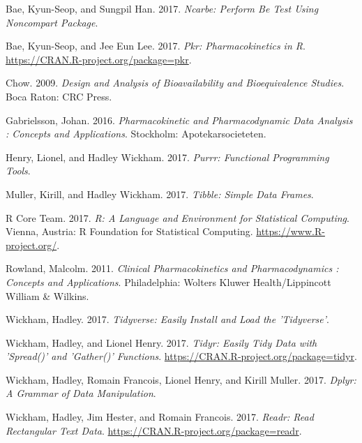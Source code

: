 \documentclass[12pt,]{krantz}
\theoremstyle{definition}
\theoremstyle{definition}
\theoremstyle{definition}
\theoremstyle{remark}
\begin{document}
\hypertarget{ref-R-ncarbe}{}
Bae, Kyun-Seop, and Sungpil Han. 2017. \emph{Ncarbe: Perform Be Test
Using Noncompart Package}.

\hypertarget{ref-R-pkr}{}
Bae, Kyun-Seop, and Jee Eun Lee. 2017. \emph{Pkr: Pharmacokinetics in
R}. \url{https://CRAN.R-project.org/package=pkr}.

\hypertarget{ref-chow2009design}{}
Chow. 2009. \emph{Design and Analysis of Bioavailability and
Bioequivalence Studies}. Boca Raton: CRC Press.

\hypertarget{ref-gab}{}
Gabrielsson, Johan. 2016. \emph{Pharmacokinetic and Pharmacodynamic Data
Analysis : Concepts and Applications}. Stockholm: Apotekarsocieteten.

\hypertarget{ref-R-purrr}{}
Henry, Lionel, and Hadley Wickham. 2017. \emph{Purrr: Functional
Programming Tools}.

\hypertarget{ref-R-tibble}{}
Muller, Kirill, and Hadley Wickham. 2017. \emph{Tibble: Simple Data
Frames}.

\hypertarget{ref-R-base}{}
R Core Team. 2017. \emph{R: A Language and Environment for Statistical
Computing}. Vienna, Austria: R Foundation for Statistical Computing.
\url{https://www.R-project.org/}.

\hypertarget{ref-tozer}{}
Rowland, Malcolm. 2011. \emph{Clinical Pharmacokinetics and
Pharmacodynamics : Concepts and Applications}. Philadelphia: Wolters
Kluwer Health/Lippincott William \& Wilkins.

\hypertarget{ref-R-tidyverse}{}
Wickham, Hadley. 2017. \emph{Tidyverse: Easily Install and Load the
'Tidyverse'}.

\hypertarget{ref-R-tidyr}{}
Wickham, Hadley, and Lionel Henry. 2017. \emph{Tidyr: Easily Tidy Data
with 'Spread()' and 'Gather()' Functions}.
\url{https://CRAN.R-project.org/package=tidyr}.

\hypertarget{ref-R-dplyr}{}
Wickham, Hadley, Romain Francois, Lionel Henry, and Kirill Muller. 2017.
\emph{Dplyr: A Grammar of Data Manipulation}.

\hypertarget{ref-R-readr}{}
Wickham, Hadley, Jim Hester, and Romain Francois. 2017. \emph{Readr:
Read Rectangular Text Data}.
\url{https://CRAN.R-project.org/package=readr}.
\end{document}
